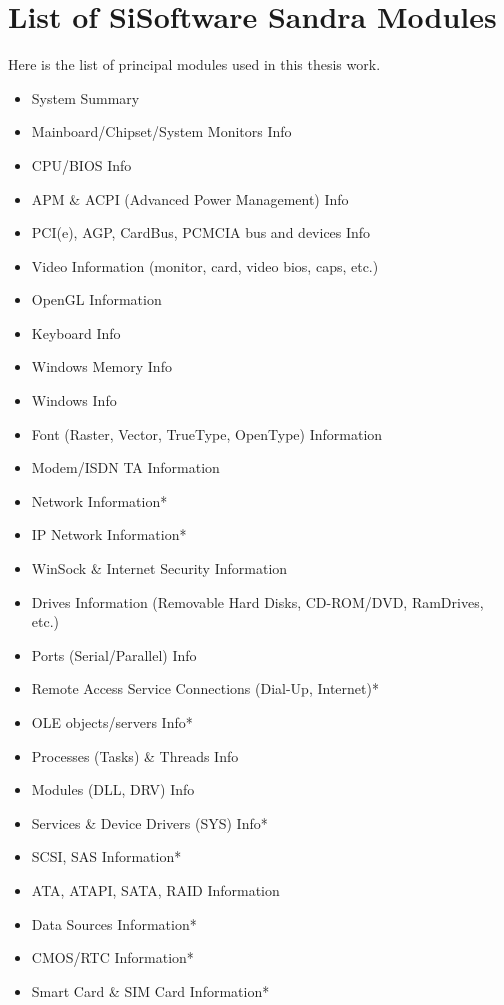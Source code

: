 

\chapter{List of SiSoftware Sandra Modules} \label{app:sandra_modules}

Here is the list of principal modules used in this thesis work.
\begin{itemize}
    \item System Summary
    \item Mainboard/Chipset/System Monitors Info
    \item CPU/BIOS Info
    \item APM \& ACPI (Advanced Power Management) Info
    \item PCI(e), AGP, CardBus, PCMCIA bus and devices Info
    \item Video Information (monitor, card, video bios, caps, etc.)
    \item OpenGL Information
    \item Keyboard Info
    \item Windows Memory Info
    \item Windows Info
    \item Font (Raster, Vector, TrueType, OpenType) Information
    \item Modem/ISDN TA Information
    \item Network Information*
    \item IP Network Information*
    \item WinSock \& Internet Security Information
    \item Drives Information (Removable Hard Disks, CD-ROM/DVD, RamDrives, etc.)
    \item Ports (Serial/Parallel) Info
    \item Remote Access Service Connections (Dial-Up, Internet)*
    \item OLE objects/servers Info*
    \item Processes (Tasks) \& Threads Info
    \item Modules (DLL, DRV) Info
    \item Services \& Device Drivers (SYS) Info*
    \item SCSI, SAS Information*
    \item ATA, ATAPI, SATA, RAID Information
    \item Data Sources Information*
    \item CMOS/RTC Information*
    \item Smart Card \& SIM Card Information*
\end{itemize}
    
